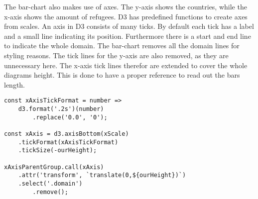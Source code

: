 The bar-chart also makes use of axes. The y-axis shows the countries, while the x-axis shows the amount of refugees. D3 has predefined functions to create axes from scales. An axis in D3 consists of many ticks. By default each tick has a label and a small line indicating its position. Furthermore there is a start and end line to indicate the whole domain. The bar-chart removes all the domain lines for styling reasons. The tick lines for the y-axis are also removed, as they are unnecessary here. The x-axis tick lines therefor are extended to cover the whole diagrams height. This is done to have a proper reference to read out the bars length.

\begin{minipage}{0.9\linewidth}
    \begin{lstlisting}[style=htmlcssjs, captionpos=b, caption={The x axis implementation of the bar chart. The first constant defines the tick format. For each number there should be two significant digits. As the zero value is represented as "0.0" to match the previous rule of two significant digits, it is simply replaced by "0". The second constant defines the function creating the axis. The previous tick format is passed here. Furthermore the \texttt{tickSize} is set to the hight of the diagram. This way the initially small tick lines now cover the whole height of the diagram and allow for easier and more accurate readouts. Finally the \texttt{xAxisParentGroup} element, which is part of ther permantent hierarchical structure of the bar-chart, calls the \texttt{xAxis} function. This adds the Axis to the diagram. As a last step the domain lines are selected and removed for styling reasons.}, label={lst:bar-chart-axes}]
const xAxisTickFormat = number =>
    d3.format('.2s')(number)
        .replace('0.0', '0');

const xAxis = d3.axisBottom(xScale)
    .tickFormat(xAxisTickFormat)
    .tickSize(-ourHeight);

xAxisParentGroup.call(xAxis)
    .attr('transform', `translate(0,${ourHeight})`)
    .select('.domain')
        .remove();
    \end{lstlisting}
\end{minipage}

